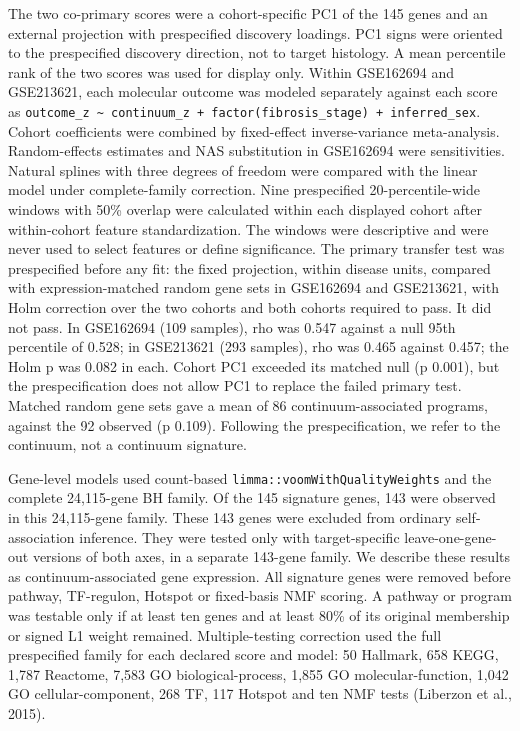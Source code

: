 The two co-primary scores were a cohort-specific PC1 of the 145 genes and an external projection with prespecified discovery loadings. PC1 signs were oriented to the prespecified discovery direction, not to target histology. A mean percentile rank of the two scores was used for display only. Within GSE162694 and GSE213621, each molecular outcome was modeled separately against each score as \texttt{outcome\_\allowbreak{}z\ \textasciitilde{}\ continuum\_\allowbreak{}z\ +\ factor(fibrosis\_\allowbreak{}stage)\ +\ inferred\_\allowbreak{}sex}. Cohort coefficients were combined by fixed-effect inverse-variance meta-analysis. Random-effects estimates and NAS substitution in GSE162694 were sensitivities. Natural splines with three degrees of freedom were compared with the linear model under complete-family correction. Nine prespecified 20-percentile-wide windows with 50\% overlap were calculated within each displayed cohort after within-cohort feature standardization. The windows were descriptive and were never used to select features or define significance. The primary transfer test was prespecified before any fit: the fixed projection, within disease units, compared with expression-matched random gene sets in GSE162694 and GSE213621, with Holm correction over the two cohorts and both cohorts required to pass. It did not pass. In GSE162694 (109 samples), rho was 0.547 against a null 95th percentile of 0.528; in GSE213621 (293 samples), rho was 0.465 against 0.457; the Holm p was 0.082 in each. Cohort PC1 exceeded its matched null (p 0.001), but the prespecification does not allow PC1 to replace the failed primary test. Matched random gene sets gave a mean of 86 continuum-associated programs, against the 92 observed (p 0.109). Following the prespecification, we refer to the continuum, not a continuum signature.

Gene-level models used count-based \texttt{limma::voomWithQualityWeights} and the complete 24,115-gene BH family. Of the 145 signature genes, 143 were observed in this 24,115-gene family. These 143 genes were excluded from ordinary self-association inference. They were tested only with target-specific leave-one-gene-out versions of both axes, in a separate 143-gene family. We describe these results as continuum-associated gene expression. All signature genes were removed before pathway, TF-regulon, Hotspot or fixed-basis NMF scoring. A pathway or program was testable only if at least ten genes and at least 80\% of its original membership or signed L1 weight remained. Multiple-testing correction used the full prespecified family for each declared score and model: 50 Hallmark, 658 KEGG, 1,787 Reactome, 7,583 GO biological-process, 1,855 GO molecular-function, 1,042 GO cellular-component, 268 TF, 117 Hotspot and ten NMF tests (Liberzon et al., 2015).

